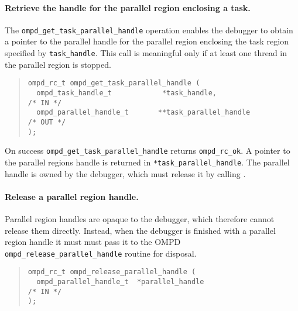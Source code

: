 \paragraph{Retrieve the handle for the parallel region enclosing a task.}
The  \verb|ompd_get_task_parallel_handle|  operation enables
the debugger to obtain a pointer to the parallel handle for the parallel region
enclosing the task region specified by \verb|task_handle|.
This call is meaningful only if at least one thread in the parallel
region is stopped.

\begin{quote}
\begin{lstlisting}
ompd_rc_t ompd_get_task_parallel_handle (
  ompd_task_handle_t            *task_handle,                       /* IN */
  ompd_parallel_handle_t       **task_parallel_handle              /* OUT */
);
\end{lstlisting}
\end{quote}
On success \texttt{ompd\_get\_task\_parallel\_handle}
returns \texttt{ompd\_rc\_ok}.
A pointer to the parallel regions handle
is returned in \texttt{*task\_parallel\_handle}.
The parallel handle is owned by the debugger, which must release it by calling
.

\paragraph{Release a parallel region handle.}
Parallel region handles are opaque to the debugger, which therefore
cannot release them directly.
Instead, when the debugger is finished with a parallel region handle
it must must pass it to the OMPD \texttt{ompd\_release\_parallel\_handle}
routine for disposal.
\begin{quote}
\begin{lstlisting}
ompd_rc_t ompd_release_parallel_handle (
  ompd_parallel_handle_t  *parallel_handle                          /* IN */
);
\end{lstlisting}
\end{quote}

